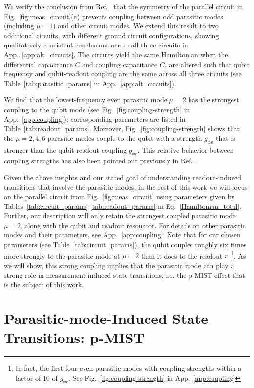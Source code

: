 \documentclass[%
reprint,
superscriptaddress,
 amsmath,amssymb,
 aps,
 prx,
longbibliography,
floatfix,
]{revtex4-2}
\begin{document}
We verify the conclusion from Ref.~\cite{viola2015collective} that the symmetry of the parallel circuit in Fig.~\ref{fig:meas_circuit}(a) prevents coupling between odd parasitic modes (including $\mu=1$) and other circuit modes. We extend this result to two additional circuits, with different ground circuit configurations, showing qualitatively consistent conclusions across all three circuits in App.~\ref{app:alt_circuits}. The circuits yield the same Hamiltonian when the differential capacitance $C$ and coupling capacitance $C_c$ are altered such that qubit frequency and qubit-readout coupling are the same across all three circuits (see Table~\ref{tab:parasitic_params} in App.~\ref{app:alt_circuits}). 
 
 We find that the lowest-frequency even parasitic mode $\mu=2$ has the strongest coupling to the qubit mode (see Fig.~\ref{fig:coupling-strength} in App.~\ref{app:coupling}); corresponding parameters are listed in Table~\ref{tab:readout_params}. Moreover, Fig.~\ref{fig:coupling-strength} shows that the $\mu=2,4,6$ parasitic modes couple to the qubit with a strength $g_{\phi\mu}$ that is stronger than the qubit-readout coupling $g_{\phi r}$. This relative behavior between coupling strengths has also been pointed out previously in Ref.~\cite{viola2015collective}.
 
 Given the above insights and our stated goal of understanding readout-induced transitions that involve the parasitic modes, in the rest of this work we will focus on the parallel circuit from Fig.~\ref{fig:meas_circuit} using parameters given by Tables~\ref{tab:circuit_params}-\ref{tab:readout_params} in Eq.~\ref{Hamiltonian_total}.  Further, our description will only retain the strongest coupled parasitic mode $\mu = 2$, along with the qubit and readout resonator.  For details on other parasitic modes and their parameters, see App.~\ref{app:coupling}. Note that for our chosen parameters (see Table~\ref{tab:circuit_params}), the qubit couples roughly six times more strongly to the parasitic mode at $\mu=2$ than it does to the readout $r$~\footnote{In fact, the first four even parasitic modes with coupling strengths within a factor of $10$ of $g_{\phi r}$. See Fig.~\ref{fig:coupling-strength} in App.~\ref{app:coupling}}.  As we will show, this strong coupling implies that the parasitic mode can play a strong role in measurement-induced state transitions, i.e. the p-MIST effect that is the subject of this work.   

\section{Parasitic-mode-Induced State Transitions: p-MIST}\label{sec:MIST}
\end{document}
